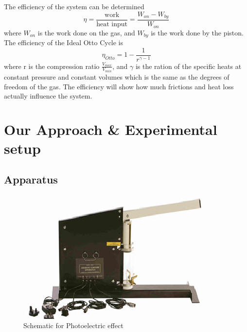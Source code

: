 \documentclass[11pt,letterpaper,onecolumn]{article}
\begin{document}
The efficiency of the system can be determined 
$$\eta=\frac{\mbox{work}}{\mbox{heat input}}=\frac{W_{on}-W_{by}}{W_{on}}$$
where $W_{on}$ is the work done on the gas, and $W_{by}$ is the work done by the piston. The efficiency of the Ideal Otto Cycle is
$$\eta_{Otto}=1 - \frac{1}{r^{\gamma-1}}$$
where r is the compression ratio $\frac{V_{max}}{V_{min}}$, and $\gamma$ is the ration of the specific heats at constant pressure and constant volumes which is the same as the degrees of freedom of the gas. The efficiency will show how much frictions and heat loss actually influence the system.~\cite{kw}



\section{Our Approach \& Experimental setup}

\subsection{Apparatus}




\begin{figure}[H]
 \begin{center}
 \includegraphics*[scale = 1.2]{Apperatus.png}
 \caption{Schematic for Photoelectric effect\label{fig:app} }
 \end{center}
\end{figure}
\end{document}
